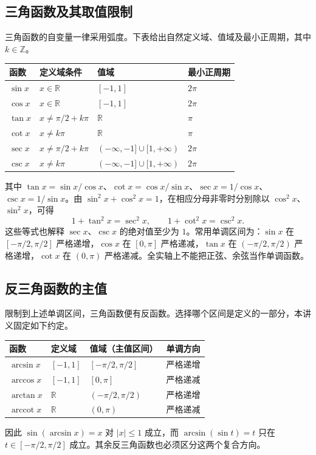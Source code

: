 \documentclass[UTF8,fontset=fandol,12pt,oneside,openany]{ctexrep}
\newcommand{\R}{\mathbb R}
\theoremstyle{definition}
\begin{document}
\subsection{三角函数及其取值限制}
三角函数的自变量一律采用弧度。下表给出自然定义域、值域及最小正周期，其中 $k\in\mathbb Z$。
\begin{center}
\begin{tabular}{llll}
\toprule
函数 & 定义域条件 & 值域 & 最小正周期\\
\midrule
$\sin x$ & $x\in\R$ & $[-1,1]$ & $2\pi$\\
$\cos x$ & $x\in\R$ & $[-1,1]$ & $2\pi$\\
$\tan x$ & $x\ne\pi/2+k\pi$ & $\R$ & $\pi$\\
$\cot x$ & $x\ne k\pi$ & $\R$ & $\pi$\\
$\sec x$ & $x\ne\pi/2+k\pi$ & $(-\infty,-1]\cup[1,+\infty)$ & $2\pi$\\
$\csc x$ & $x\ne k\pi$ & $(-\infty,-1]\cup[1,+\infty)$ & $2\pi$\\
\bottomrule
\end{tabular}
\end{center}
其中 $\tan x=\sin x/\cos x$、$\cot x=\cos x/\sin x$、$\sec x=1/\cos x$、$\csc x=1/\sin x$。由 $\sin^2x+\cos^2x=1$，在相应分母非零时分别除以 $\cos^2x$、$\sin^2x$，可得
\[
 1+\tan^2x=\sec^2x,\qquad 1+\cot^2x=\csc^2x.
\]
这些等式也解释 $\sec x$、$\csc x$ 的绝对值至少为 $1$。常用单调区间为：$\sin x$ 在 $[-\pi/2,\pi/2]$ 严格递增，$\cos x$ 在 $[0,\pi]$ 严格递减，$\tan x$ 在 $(-\pi/2,\pi/2)$ 严格递增，$\cot x$ 在 $(0,\pi)$ 严格递减。全实轴上不能把正弦、余弦当作单调函数。

\subsection{反三角函数的主值}
限制到上述单调区间，三角函数便有反函数。选择哪个区间是定义的一部分，本讲义固定如下约定。
\begin{center}
\begin{tabular}{llll}
\toprule
函数 & 定义域 & 值域（主值区间） & 单调方向\\
\midrule
$\arcsin x$ & $[-1,1]$ & $[-\pi/2,\pi/2]$ & 严格递增\\
$\arccos x$ & $[-1,1]$ & $[0,\pi]$ & 严格递减\\
$\arctan x$ & $\R$ & $(-\pi/2,\pi/2)$ & 严格递增\\
$\operatorname{arccot}x$ & $\R$ & $(0,\pi)$ & 严格递减\\
\bottomrule
\end{tabular}
\end{center}
因此 $\sin(\arcsin x)=x$ 对 $|x|\le1$ 成立，而 $\arcsin(\sin t)=t$ 只在 $t\in[-\pi/2,\pi/2]$ 成立。其余反三角函数也必须区分这两个复合方向。
\end{document}

